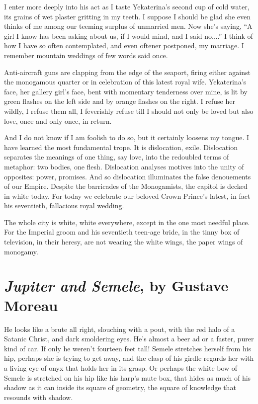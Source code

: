 \documentclass[english,11pt,letterpaper,onecolumn]{scrbook}
\begin{document}
	I enter more deeply into his act as I taste Yekaterina's second cup of cold water, its grains of wet plaster gritting in my teeth.  I suppose I should be glad she even thinks of me among our teeming surplus of unmarried men.  Now she's saying, ``A girl I know has been asking about us, if I would mind, and I said no....''  I think of how I have so often contemplated, and even oftener postponed, my marriage.  I remember mountain weddings of few words said once.

	Anti-aircraft guns are clapping from the edge of the seaport, firing either against the monogamous quarter or in celebration of this latest royal wife.  Yekaterina's face, her gallery girl's face, bent with momentary tenderness over mine, is lit by green flashes on the left side and by orange flashes on the right.  I refuse her wildly, I refuse them all, I feverishly refuse till I should not only be loved but also love, once and only once, in return.

	And I do not know if I am foolish to do so, but it certainly loosens my tongue.  I have learned the most fundamental trope.  It is dislocation, exile.  Dislocation separates the meanings of one thing, say love, into the redoubled terms of metaphor:  two bodies, one flesh.  Dislocation analyses motives into the unity of opposites:  power, promises.  And so dislocation illuminates the false denouements of our Empire.  Despite the barricades of the Monogamists, the capitol is decked in white today.  For today we celebrate our beloved Crown Prince's latest, in fact his seventieth, fallacious royal wedding.

	The whole city is white, white everywhere, except in the one most needful place.  For the Imperial groom and his seventieth teen-age bride, in the tinny box of television, in their heresy, are not wearing the white wings, the paper wings of monogamy.


\newpage
\section{\emph{Jupiter and Semele}, by Gustave Moreau}

He looks like a brute all right, slouching with a pout, with the red halo of a Satanic Christ, and dark smoldering eyes.  He's almost a beer ad or a faster, purer kind of car.  If only he weren't fourteen feet tall!
Semele stretches herself from his hip, perhaps she is trying to get away, and the clasp of his girdle regards her with a living eye of onyx that holds her in its grasp.  Or perhaps the white bow of Semele is stretched on his hip like his harp's mute box, that hides as much of his shadow as it can inside its square of geometry, the square of knowledge that resounds with shadow.
\end{document}
